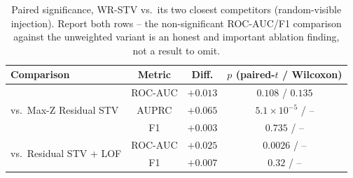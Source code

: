 \begin{table}[t]
\centering
\caption{Paired significance, WR-STV vs.\ its two closest competitors
(random-visible injection). Report both rows -- the non-significant
ROC-AUC/F1 comparison against the unweighted variant is an honest and
important ablation finding, not a result to omit.}
\label{tab:extra-baseline-stats}
\begin{tabular}{lccc}
\toprule
\textbf{Comparison} & \textbf{Metric} & \textbf{Diff.} & \textbf{$p$ (paired-$t$ / Wilcoxon)} \\
\midrule
\multirow{3}{*}{vs.\ Max-Z Residual STV}
 & ROC-AUC & $+0.013$ & $0.108$ / $0.135$ \\
 & AUPRC   & $+0.065$ & $5.1\times10^{-5}$ / -- \\
 & F1      & $+0.003$ & $0.735$ / -- \\
\midrule
\multirow{2}{*}{vs.\ Residual STV + LOF}
 & ROC-AUC & $+0.025$ & $0.0026$ / -- \\
 & F1      & $+0.007$ & $0.32$ / -- \\
\bottomrule
\end{tabular}
\end{table}
